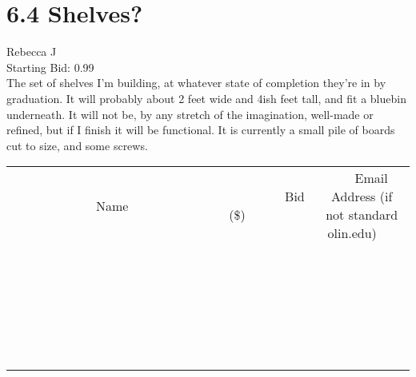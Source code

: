 \documentclass[11pt]{article}
\begin{document}
					\section*{6.4 Shelves?}
					Rebecca J \\
					Starting Bid: 0.99 \\
					The set of shelves I'm building, at whatever state of completion they're in by graduation. It will probably about 2 feet wide and 4ish feet tall, and fit a bluebin underneath. It will not be, by any stretch of the imagination, well-made or refined, but if I finish it will be functional. It is currently a small pile of boards cut to size, and some screws. \\
					[6ex]
					\begin{tabular}{c c c}
						~~~~~~~~~~~~~Name~~~~~~~~~~~~~ & ~~~~~~~~~Bid (\$)~~~~~~~~~ & ~~~Email Address (if not standard olin.edu)~~~ \\
				
 & & \\
\hline
 & & \\
\hline
 & & \\
\hline
 & & \\
\hline
 & & \\
\hline
 & & \\
\hline
 & & \\
\hline
 & & \\
\hline
 & & \\
\hline
 & & \\
\hline
 & & \\
\hline
 & & \\
\hline
 & & \\
\hline
 & & \\
\hline
 & & \\
\hline
 & & \\
\hline
 & & \\
\hline
 & & \\
\hline
 & & \\
\hline
 & & \\
\hline
 & & \\
\hline
 & & \\
\hline
 & & \\
\hline
 & & \\
\hline
 & & \\
\hline
 & & \\
\hline
					\end{tabular}
					\clearpage
				
\end{document}
